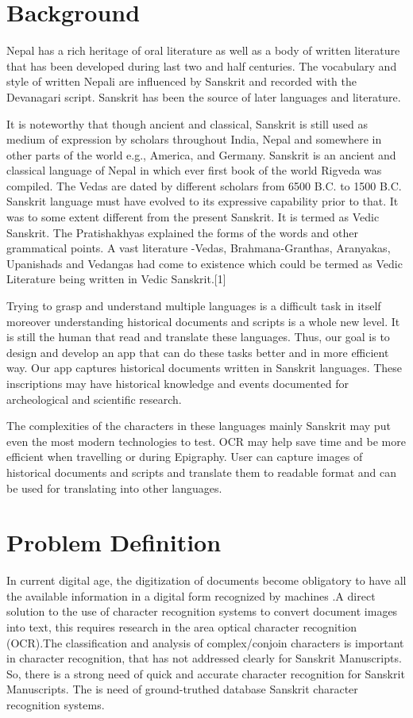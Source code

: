 \section{Background}\label{sec:bkgrnd}%
Nepal has a rich heritage of oral literature as well as a body of written literature that has been developed during last two and half centuries. The vocabulary and style of written Nepali are influenced by Sanskrit and recorded with the Devanagari script. Sanskrit has been the source of later languages and literature.
\par
 It is noteworthy that though ancient and classical, Sanskrit is still used as medium of expression by scholars throughout India, Nepal and somewhere in other parts of the world e.g., America, and Germany. Sanskrit is an ancient and classical language of Nepal in which ever first book of the world Rigveda was compiled. The Vedas are dated by different scholars from 6500 B.C. to 1500 B.C. Sanskrit language must have evolved to its expressive capability prior to that. It was to some extent different from the present Sanskrit. It is termed as Vedic Sanskrit. The Pratishakhyas explained the forms of the words and other grammatical points. A vast literature -Vedas, Brahmana-Granthas, Aranyakas, Upanishads and Vedangas had come to existence which could be termed as Vedic Literature being written in Vedic Sanskrit.[1]
 \par
Trying to grasp and understand multiple languages is a difficult task in itself moreover understanding historical documents and scripts is a whole new level. It is still the human that read and translate these languages. Thus, our goal is to design and develop an app that can do these tasks better and in more efficient way. Our app captures historical documents written in Sanskrit languages. These inscriptions may have historical knowledge and events documented for archeological and scientific research.
\par
 The complexities of the characters in these languages mainly Sanskrit may put even the most modern technologies to test. OCR may help save time and be more efficient when travelling or during Epigraphy. User can capture images of historical documents and scripts and translate them to readable format and can be used for translating into other languages. 

\section{Problem Definition}
In current digital age, the digitization of documents become obligatory to have all the available information in a digital form recognized by machines .A direct solution to the use of character recognition systems to convert document images into text, this requires research in the area optical character recognition (OCR).The classification and analysis of complex/conjoin characters is important in character recognition, that has not addressed clearly for Sanskrit Manuscripts. So, there is a strong need of quick and accurate character recognition for Sanskrit Manuscripts. The is need of ground-truthed database Sanskrit character recognition systems.

